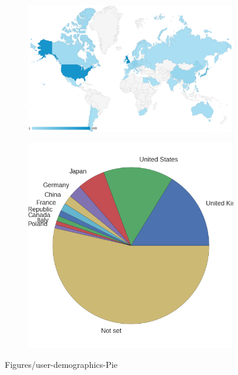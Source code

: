 \documentclass[dissertation.tex]{subfiles}
\begin{document}
\begin{figure}[htpb]
  \centering
  \begin{subfigure}[b]{0.98\textwidth}
    \centering
    \includegraphics[width=1.0\linewidth]{Figures/participants-by-country.png}
  \end{subfigure}
  \begin{subfigure}[b]{0.48\textwidth}
    \centering
    \includegraphics[width=1.0\linewidth]{Figures/user-demographics-pie.png}
  \end{subfigure}
  \begin{subfigure}[b]{0.48\textwidth}
    \centering
    
  \end{subfigure}
  \caption{Figures/user-demographics-Pie}
  \label{fig:Figures/user-demographics-pie}
\end{figure}
\end{document}

